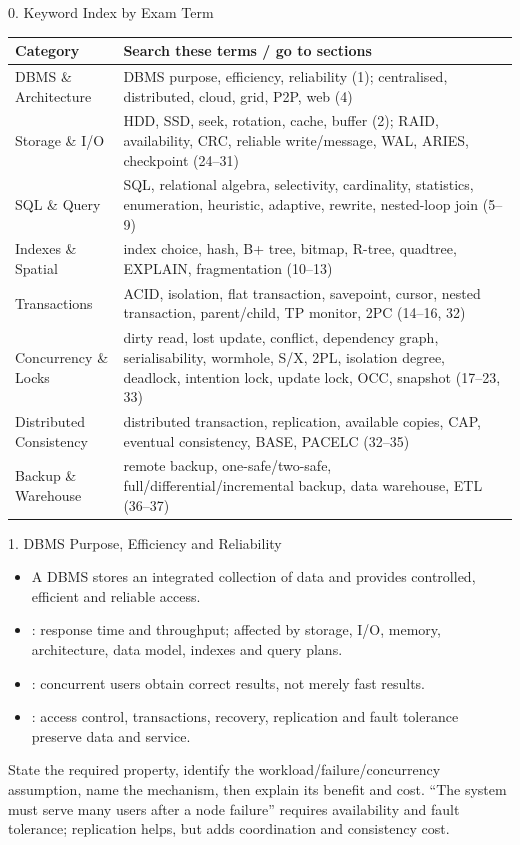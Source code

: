 \begin{topic}{0. Keyword Index by Exam Term}
\begin{tabularx}{\linewidth}{@{}lY@{}}
\toprule
Category & Search these terms / go to sections\\
\midrule
DBMS \& Architecture & DBMS purpose, efficiency, reliability (1); centralised, distributed, cloud, grid, P2P, web (4)\\
Storage \& I/O & HDD, SSD, seek, rotation, cache, buffer (2); RAID, availability, CRC, reliable write/message, WAL, ARIES, checkpoint (24--31)\\
SQL \& Query & SQL, relational algebra, selectivity, cardinality, statistics, enumeration, heuristic, adaptive, rewrite, nested-loop join (5--9)\\
Indexes \& Spatial & index choice, hash, B+ tree, bitmap, R-tree, quadtree, EXPLAIN, fragmentation (10--13)\\
Transactions & ACID, isolation, flat transaction, savepoint, cursor, nested transaction, parent/child, TP monitor, 2PC (14--16, 32)\\
Concurrency \& Locks & dirty read, lost update, conflict, dependency graph, serialisability, wormhole, S/X, 2PL, isolation degree, deadlock, intention lock, update lock, OCC, snapshot (17--23, 33)\\
Distributed Consistency & distributed transaction, replication, available copies, CAP, eventual consistency, BASE, PACELC (32--35)\\
Backup \& Warehouse & remote backup, one-safe/two-safe, full/differential/incremental backup, data warehouse, ETL (36--37)\\
\bottomrule
\end{tabularx}
\end{topic}

\begin{topic}{1. DBMS Purpose, Efficiency and Reliability}
\points
\begin{itemize}
  \item A DBMS stores an integrated collection of data and provides controlled, efficient and reliable access.
  \item {}: response time and throughput; affected by storage, I/O, memory, architecture, data model, indexes and query plans.
  \item {}: concurrent users obtain correct results, not merely fast results.
  \item {}: access control, transactions, recovery, replication and fault tolerance preserve data and service.
\end{itemize}
\answer State the required property, identify the workload/failure/concurrency assumption, name the mechanism, then explain its benefit and cost.
\worked ``The system must serve many users after a node failure'' requires availability and fault tolerance; replication helps, but adds coordination and consistency cost.
\end{topic}

